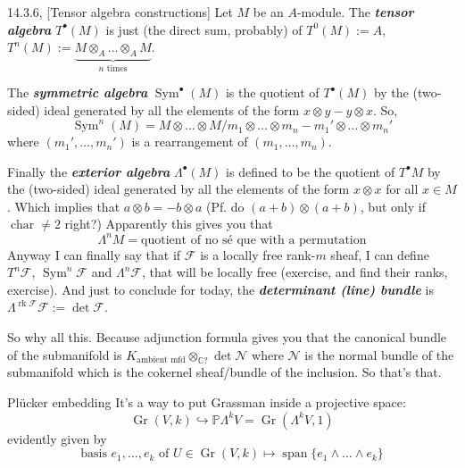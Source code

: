 \begin{thing6}{14.3.6, \cite{sea}}[Tensor algebra constructions]\leavevmode
Let \(M\) be an \(A\)-module. The \textit{\textbf{tensor algebra}} \(T^\bullet(M)\) is just (the direct sum, probably) of \(T^0(M):=A\), \(T^n(M):=\underbrace{M\otimes_A \ldots\otimes_A M}_{n\text{ times} }\).

The \textit{\textbf{symmetric algebra}} \(\operatorname{Sym}^\bullet(M)\) is the quotient of \(T^\bullet (M)\) by the (two-sided) ideal generated by all the elements of the form \(x \otimes y -y \otimes x\). So,
\[\operatorname{Sym}^n(M)=M \otimes \ldots \otimes M \Big/m_1 \otimes \ldots \otimes m_n - m_1' \otimes \ldots \otimes m_n'\]
where \((m_1',\ldots,m_n')\) is a rearrangement of \((m_1,\ldots,m_n)\).

Finally the \textit{\textbf{exterior algebra}} \(\Lambda^{\bullet}(M)\) is defined to be the quotient of \(T^\bullet M\) by the (two-sided) ideal generated by all the elements of the form \(x \otimes x\) for all \(x \in M\). Which implies that \(a \otimes b = -b \otimes a\) (Pf. do \((a+b) \otimes (a+b)\), but only if \(\operatorname{char}\neq 2\) right?) Apparently this gives you that
\[\Lambda^{n}M=\text{quotient of no sé que with a permutation} \]
Anyway I can finally say that if \(\mathcal{F}\) is a locally free rank-\(m\) sheaf, I can define \(T^n \mathcal{F}\), \(\operatorname{Sym}^n\mathcal{F}\) and \(\Lambda^{n}\mathcal{F}\), that will be locally free (exercise, and find their ranks, exercise). And just to conclude for today, the \textit{\textbf{determinant (line) bundle}} is  \(\Lambda^{\operatorname{rk}\mathcal{F}}\mathcal{F}:=\det\mathcal{F}\).
\end{thing6}
So why all this. Because adjunction formula gives you that the canonical bundle of the submanifold is \(K_{\text{ambient mfd}}\otimes_{\mathbb{C}?} \det \mathcal{N}\) where \(\mathcal{N}\) is the normal bundle of the submanifold which is the cokernel sheaf/bundle of the inclusion. So that's that.

\begin{thing7}{Plücker embedding}\leavevmode
It's a way to put Grassman inside a projective space:
\[\operatorname{Gr}(V,k) \hookrightarrow \mathbb{P}\Lambda^{k}V = \operatorname{Gr}(\Lambda^{k}V,1)\]
evidently given by
\[\text{basis } e_1,\ldots,e_k\text{ of \(U \in \operatorname{Gr}(V,k)\)}\longmapsto \operatorname{span}\{e_1 \wedge \ldots \wedge e_k\}\]


\end{thing7}





